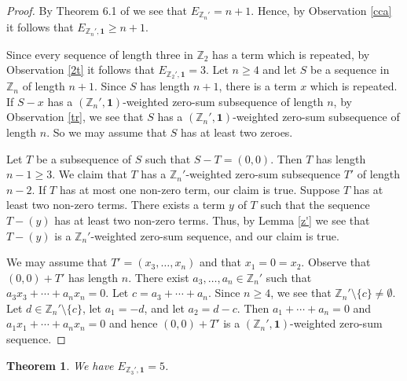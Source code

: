 \documentclass{article}[11pt]
\newtheorem{theorem}{Theorem}[section]
\theoremstyle{definition}
\begin{document}
\begin{proof}
By Theorem 6.1 of \cite{ACFKP} we see that $E_{\mathbb Z_n'}=n+1$. Hence, by Observation \ref{cca} it follows that $E_{\mathbb Z_n',\mathbf 1}\geq n+1$.

Since every sequence of length three in $\mathbb Z_2$ has a term which is repeated, by Observation \ref{2t} it follows that $E_{\mathbb Z_2',\mathbf 1}=3$. Let $n\geq 4$ and let $S$ be a sequence in $\mathbb Z_n$ of length $n+1$. Since $S$ has length $n+1$, there is a term $x$ which is repeated. If $S-x$ has a $(\mathbb Z_n',\mathbf 1)$-weighted zero-sum subsequence of length $n$, by Observation \ref{tr}, we see that $S$ has a $(\mathbb Z_n',\mathbf 1)$-weighted zero-sum subsequence of length $n$. So we may assume that $S$ has at least two zeroes.

Let $T$ be a subsequence of $S$ such that $S-T=(0,0)$. Then $T$ has length $n-1\geq 3$. We claim that $T$ has a $\mathbb Z_n'$-weighted zero-sum subsequence $T'$ of length $n-2$. If $T$ has at most one non-zero term, our claim is true. Suppose $T$ has at least two non-zero terms. There exists a term $y$ of $T$ such that the sequence $T-(y)$ has at least two non-zero terms. Thus, by Lemma \ref{z'} we see that $T-(y)$ is a $\mathbb Z_n'$-weighted zero-sum sequence, and our claim is true.

We may assume that $T'=(x_3,\ldots,x_n)$ and that $x_1=0=x_2$. Observe that $(0,0)+T'$ has length $n$. There exist $a_3,\ldots,a_n\in \mathbb Z_n'$ such that $a_3x_3+\cdots+a_nx_n=0$. Let $c=a_3+\cdots+a_n$. Since $n\geq 4$, we see that $\mathbb Z_n'\setminus \{c\}\neq \emptyset$. Let $d\in \mathbb Z_n'\setminus \{c\}$, let $a_1=-d$, and let $a_2=d-c$. Then $a_1+\cdots+a_n=0$ and $a_1x_1+\cdots +a_nx_n=0$ and hence $(0,0)+T'$ is a $(\mathbb Z_n',\mathbf 1)$-weighted zero-sum sequence.
\end{proof}


\begin{theorem}\label{enz3}
We have $E_{\mathbb Z_3',\mathbf 1}=5$.
\end{theorem}
\end{document}
